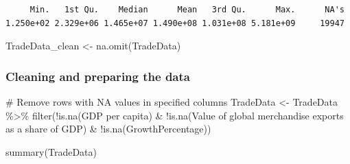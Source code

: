 \documentclass[
  10pt,
]{article}
\newenvironment{Shaded}{\begin{snugshade}}{\end{snugshade}}
\newcommand{\AttributeTok}[1]{\textcolor[rgb]{0.40,0.45,0.13}{#1}}
\newcommand{\CommentTok}[1]{\textcolor[rgb]{0.37,0.37,0.37}{#1}}
\newcommand{\FunctionTok}[1]{\textcolor[rgb]{0.28,0.35,0.67}{#1}}
\newcommand{\NormalTok}[1]{\textcolor[rgb]{0.00,0.23,0.31}{#1}}
\newcommand{\OtherTok}[1]{\textcolor[rgb]{0.00,0.23,0.31}{#1}}
\newcommand{\SpecialCharTok}[1]{\textcolor[rgb]{0.37,0.37,0.37}{#1}}
\newcommand{\StringTok}[1]{\textcolor[rgb]{0.13,0.47,0.30}{#1}}
\begin{document}
\begin{Shaded}
\end{Shaded}

\begin{verbatim}
     Min.   1st Qu.    Median      Mean   3rd Qu.      Max.      NA's 
1.250e+02 2.329e+06 1.465e+07 1.490e+08 1.031e+08 5.181e+09     19947 
\end{verbatim}

\begin{Shaded}
\begin{Highlighting}[]
\NormalTok{TradeData\_clean }\OtherTok{\textless{}{-}} \FunctionTok{na.omit}\NormalTok{(TradeData)}
\end{Highlighting}
\end{Shaded}

\subsubsection{Cleaning and preparing the
data}\label{cleaning-and-preparing-the-data}

\begin{Shaded}
\begin{Highlighting}[]
\CommentTok{\# Remove rows with NA values in specified columns}
\NormalTok{TradeData }\OtherTok{\textless{}{-}}\NormalTok{ TradeData }\SpecialCharTok{\%\textgreater{}\%}
  \FunctionTok{filter}\NormalTok{(}\SpecialCharTok{!}\FunctionTok{is.na}\NormalTok{(}\StringTok{\textasciigrave{}}\AttributeTok{GDP per capita}\StringTok{\textasciigrave{}}\NormalTok{) }\SpecialCharTok{\&} 
         \SpecialCharTok{!}\FunctionTok{is.na}\NormalTok{(}\StringTok{\textasciigrave{}}\AttributeTok{Value of global merchandise exports as a share of GDP}\StringTok{\textasciigrave{}}\NormalTok{) }\SpecialCharTok{\&} 
         \SpecialCharTok{!}\FunctionTok{is.na}\NormalTok{(GrowthPercentage))}
\end{Highlighting}
\end{Shaded}

\begin{Shaded}
\begin{Highlighting}[]
\FunctionTok{summary}\NormalTok{(TradeData)}
\end{Highlighting}
\end{Shaded}
\end{document}
